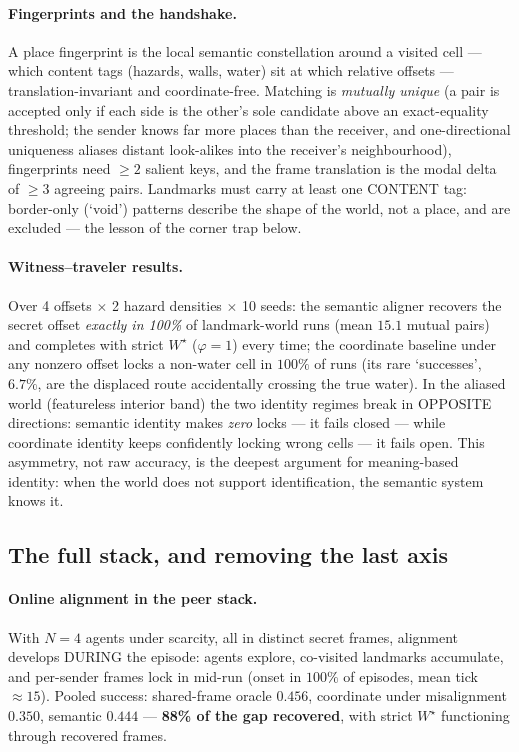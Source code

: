 \documentclass{article}
\newcommand{\wstar}{W^{\star}}
\begin{document}
\paragraph{Fingerprints and the handshake.} A place fingerprint is the
local semantic constellation around a visited cell --- which content
tags (hazards, walls, water) sit at which relative offsets ---
translation-invariant and coordinate-free. Matching is
\emph{mutually unique} (a pair is accepted only if each side is the
other's sole candidate above an exact-equality threshold; the sender
knows far more places than the receiver, and one-directional
uniqueness aliases distant look-alikes into the receiver's
neighbourhood), fingerprints need $\ge 2$ salient keys, and the frame
translation is the modal delta of $\ge 3$ agreeing pairs. Landmarks
must carry at least one CONTENT tag: border-only (`void') patterns
describe the shape of the world, not a place, and are excluded ---
the lesson of the corner trap below.

\paragraph{Witness--traveler results.} Over 4 offsets $\times$ 2
hazard densities $\times$ 10 seeds: the semantic aligner recovers the
secret offset \emph{exactly in 100\%} of landmark-world runs
(mean $15.1$ mutual pairs) and completes with strict $\wstar$
($\varphi{=}1$) every time; the coordinate baseline under any nonzero
offset locks a non-water cell in $100\%$ of runs (its rare
`successes', $6.7\%$, are the displaced route accidentally crossing
the true water). In the aliased world (featureless interior band) the
two identity regimes break in OPPOSITE directions: semantic identity
makes \emph{zero} locks --- it fails closed --- while coordinate
identity keeps confidently locking wrong cells --- it fails open.
This asymmetry, not raw accuracy, is the deepest argument for
meaning-based identity: when the world does not support
identification, the semantic system knows it.

\subsection{The full stack, and removing the last axis}
\label{p3:sec:stack}

\paragraph{Online alignment in the peer stack.} With $N{=}4$ agents
under scarcity, all in distinct secret frames, alignment develops
DURING the episode: agents explore, co-visited landmarks accumulate,
and per-sender frames lock in mid-run (onset in $100\%$ of episodes,
mean tick ${\approx}15$). Pooled success: shared-frame oracle
$0.456$, coordinate under misalignment $0.350$, semantic $0.444$ ---
\textbf{88\% of the gap recovered}, with strict $\wstar$ functioning
through recovered frames.
\end{document}
